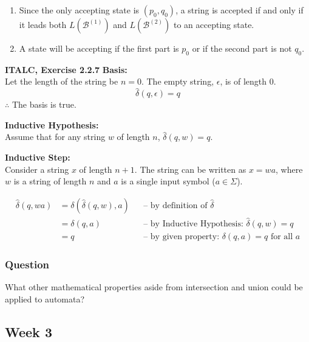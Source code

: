 \documentclass{article}
\theoremstyle{theorem}
\theoremstyle{definition}
\theoremstyle{remark}
\begin{document}
\begin{enumerate}
\item Since the only accepting state is $(p_0, q_0)$, a string is accepted if and only if it leads both $L(\mathcal{B}^{(1)})$ and $L(\mathcal{B}^{(2)})$ to an accepting state.  
    \item A state will be accepting if the first part is $p_0$ or if the second part is not $q_0$.
\end{enumerate}   

\textbf{ITALC, Exercise 2.2.7}
\textbf{Basis:} \\
Let the length of the string be $n=0$. The empty string, $\epsilon$, is of length 0.
\[ \hat{\delta}(q, \epsilon) = q \]
$\therefore$ The basis is true.

\vspace{1em}

\textbf{Inductive Hypothesis:} \\
Assume that for any string $w$ of length $n$, $\hat{\delta}(q, w) = q$.

\vspace{1em}

\textbf{Inductive Step:} \\
Consider a string $x$ of length $n+1$. The string can be written as $x = wa$, where $w$ is a string of length $n$ and $a$ is a single input symbol ($a \in \Sigma$).

\begin{align*}
\hat{\delta}(q, wa) &= \delta(\hat{\delta}(q, w), a) && \text{-- by definition of } \hat{\delta} \\
&= \delta(q, a) && \text{-- by Inductive Hypothesis: } \hat{\delta}(q, w) = q \\
&= q && \text{-- by given property: } \delta(q, a) = q \text{ for all } a
\end{align*}

\subsubsection{Question}
What other mathematical properties aside from intersection and union could be applied to automata?

\subsection{Week 3}
\end{document}
